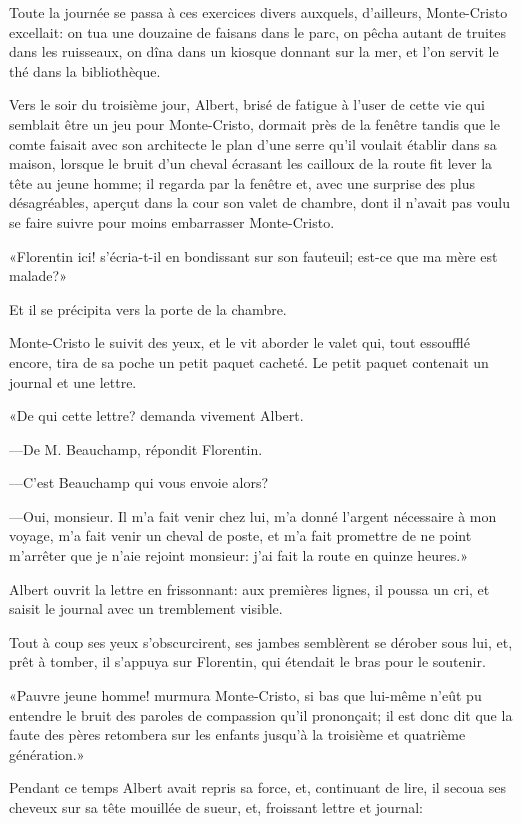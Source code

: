 Toute la journée se passa à ces exercices divers auxquels, d'ailleurs, Monte-Cristo excellait: on tua une douzaine de faisans dans le parc, on pêcha autant de truites dans les ruisseaux, on dîna dans un kiosque donnant sur la mer, et l'on servit le thé dans la bibliothèque. 

Vers le soir du troisième jour, Albert, brisé de fatigue à l'user de cette vie qui semblait être un jeu pour Monte-Cristo, dormait près de la fenêtre tandis que le comte faisait avec son architecte le plan d'une serre qu'il voulait établir dans sa maison, lorsque le bruit d'un cheval écrasant les cailloux de la route fit lever la tête au jeune homme; il regarda par la fenêtre et, avec une surprise des plus désagréables, aperçut dans la cour son valet de chambre, dont il n'avait pas voulu se faire suivre pour moins embarrasser Monte-Cristo. 

«Florentin ici! s'écria-t-il en bondissant sur son fauteuil; est-ce que ma mère est malade?» 

Et il se précipita vers la porte de la chambre. 

Monte-Cristo le suivit des yeux, et le vit aborder le valet qui, tout essoufflé encore, tira de sa poche un petit paquet cacheté. Le petit paquet contenait un journal et une lettre. 

«De qui cette lettre? demanda vivement Albert. 

—De M. Beauchamp, répondit Florentin. 

—C'est Beauchamp qui vous envoie alors? 

—Oui, monsieur. Il m'a fait venir chez lui, m'a donné l'argent nécessaire à mon voyage, m'a fait venir un cheval de poste, et m'a fait promettre de ne point m'arrêter que je n'aie rejoint monsieur: j'ai fait la route en quinze heures.» 

Albert ouvrit la lettre en frissonnant: aux premières lignes, il poussa un cri, et saisit le journal avec un tremblement visible. 

Tout à coup ses yeux s'obscurcirent, ses jambes semblèrent se dérober sous lui, et, prêt à tomber, il s'appuya sur Florentin, qui étendait le bras pour le soutenir. 

«Pauvre jeune homme! murmura Monte-Cristo, si bas que lui-même n'eût pu entendre le bruit des paroles de compassion qu'il prononçait; il est donc dit que la faute des pères retombera sur les enfants jusqu'à la troisième et quatrième génération.» 

Pendant ce temps Albert avait repris sa force, et, continuant de lire, il secoua ses cheveux sur sa tête mouillée de sueur, et, froissant lettre et journal: 


